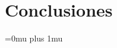 \documentclass[
11pt, %
spanish,
singlespacing, %
parskip, %
headsepline, %
]{MastersDoctoralThesis} %
\begin{document}
%



\chapter{Conclusiones} %
\label{ChapterConclusiones} 

 




%
%
%


\Urlmuskip=0mu plus 1mu\relax
\raggedright
\printbibliography[heading=bibintoc]

\end{document}
